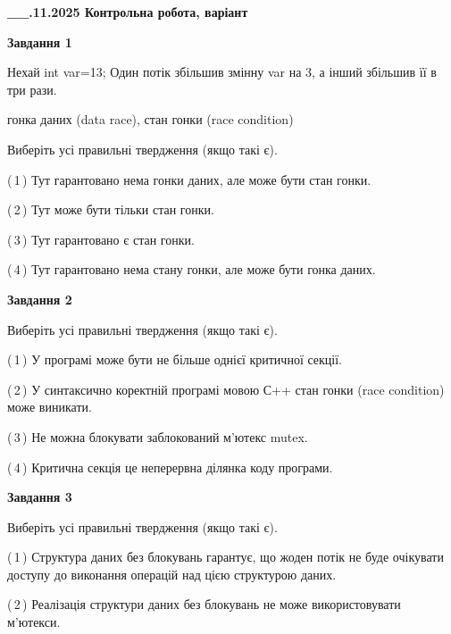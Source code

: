 \documentclass[12pt, ukrainian]{article}
\begin{document}
\begin {large}

\textbf{\_\_.11.2025 Контрольна робота, варіант  }\par


{

\begin{center}
\textbf{Завдання 1}
\end{center}
Нехай int var=13; Один потік збільшив змінну var на 3, а інший збільшив її в три рази.

гонка даних (data race), стан гонки (race condition)

Виберіть усі правильні твердження (якщо такі є).\par
\vspace{2mm}
(\,1\,) Тут гарантовано нема гонки даних, але може бути стан гонки.%

(\,2\,) Тут може бути тільки стан гонки.%

(\,3\,) Тут гарантовано є стан гонки.%

(\,4\,) Тут гарантовано нема стану гонки, але може бути гонка даних.%



\begin{center}
\textbf{Завдання 2}
\end{center}
Виберіть усі правильні твердження (якщо такі є).\par
\vspace{2mm}

(\,1\,) У програмі може бути не більше однієї критичної секції.%

(\,2\,) У синтаксично коректній програмі мовою С++ стан гонки (race condition) може виникати.%

(\,3\,) Не можна блокувати заблокований м’ютекс mutex.%

(\,4\,) Критична секція це неперервна ділянка коду програми.%



\begin{center}
\textbf{Завдання 3}
\end{center}
Виберіть усі правильні твердження (якщо такі є).\par
\vspace{2mm}

(\,1\,) Структура даних без блокувань гарантує, що жоден потік не буде очікувати доступу до виконання операцій над цією структурою даних.%

(\,2\,) Реалізація структури даних без блокувань не може використовувати м’ютекси.%

}
\end{large}
\end{document}
